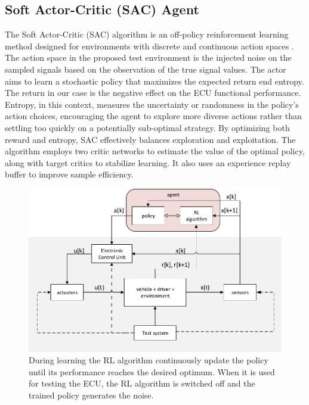 \documentclass[a4paper, fleqn]{template/cas-dc}
\begin{document}
	\subsection{Soft Actor-Critic (SAC) Agent}
	The Soft Actor-Critic (SAC) algorithm is an off-policy reinforcement learning method designed for environments with discrete and continuous action spaces \cite{christodoulou2019soft, haarnoja2018soft}. The action space in the proposed test environment is the injected noise on the sampled signals based on the observation of the true signal values. The actor aims to learn a stochastic policy that maximizes the expected return end entropy. The return in our case is the negative effect on the ECU functional performance. Entropy, in this context, measures the uncertainty or randomness in the policy’s action choices, encouraging the agent to explore more diverse actions rather than settling too quickly on a potentially sub-optimal strategy. By optimizing both reward and entropy, SAC effectively balances exploration and exploitation. The algorithm employs two critic networks to estimate the value of the optimal policy, along with target critics to stabilize learning. It also uses an experience replay buffer to improve sample efficiency.
	
	\begin{figure}[h]
		\begin{center}
			\includegraphics[scale=0.5]{figures/system4.pdf}
			\caption{During learning the RL algorithm continuously update the policy until its performance reaches the desired optimum. When it is used for testing the ECU, the RL algorithm is switched off and the trained policy generates the noise.}
			\label{fig:RL}			
		\end{center}
	\end{figure}
	
\end{document}
